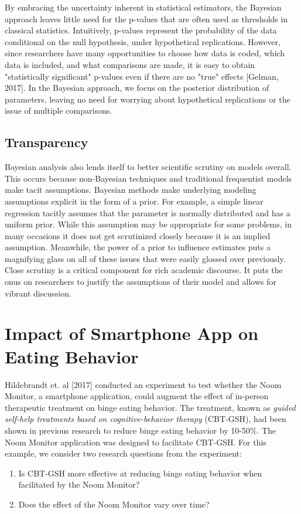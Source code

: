 \documentclass{article}
\begin{document}
By embracing the uncertainty inherent in statistical estimators, the Bayesian approach leaves little need for the p-values that are often used as thresholds in classical statistics.  Intuitively, p-values represent the probability of the data conditional on the null hypothesis, under hypothetical replications.  However, since researchers have many opportunities to choose how data is coded, which data is included, and what comparisons are made, it is easy to obtain "statistically significant" p-values even if there are no "true" effects [Gelman, 2017].  In the Bayesian approach, we focus on the posterior distribution of parameters, leaving no need for worrying about hypothetical replications or the issue of multiple comparisons.

\subsection{Transparency}
Bayesian analysis also lends itself to better scientific scrutiny on models overall. This occurs because non-Bayesian techniques and traditional frequentist models make tacit assumptions. Bayesian methods make underlying modeling assumptions explicit in the form of a prior. For example, a simple linear regression tacitly assumes that the parameter is normally distributed and has a uniform prior. While this assumption may be appropriate for some problems, in many occasions it does not get scrutinized closely because it is an implied assumption. Meanwhile, the power of a prior to influence estimates puts a magnifying glass on all of these issues that were easily glossed over previously.  Close scrutiny is a critical component for rich academic discourse. It puts the onus on researchers to justify the assumptions of their model and allows for vibrant discussion. 

\section{Impact of Smartphone App on Eating Behavior}

Hildebrandt et. al [2017] conducted an experiment to test whether the Noom Monitor, a smartphone application, could augment the effect of in-person therapeutic treatment on binge eating behavior.  The treatment, known as \emph{guided self-help treatments based on cognitive-behavior therapy} (CBT-GSH), had been shown in previous research to reduce binge eating behavior by 10-50\%.  The Noom Monitor application was designed to facilitate CBT-GSH.  For this example, we consider two research questions from the experiment:
\begin{enumerate}
\item{Is CBT-GSH more effective at reducing binge eating behavior when facilitated by the Noom Monitor?}
\item{Does the effect of the Noom Monitor vary over time?}
\end{enumerate}
\end{document}
